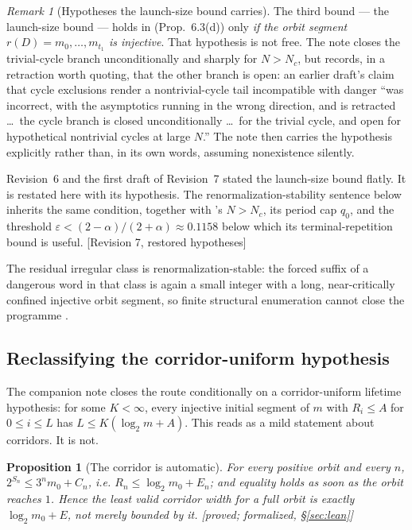 \documentclass[11pt]{article}
\theoremstyle{plain}
\newtheorem{proposition}[theorem]{Proposition}
\theoremstyle{definition}
\theoremstyle{remark}
\newtheorem{remark}[theorem]{Remark}
\newcommand{\al}{\alpha}
\newcommand{\status}[1]{\textsf{\footnotesize[#1]}}
\begin{document}
\begin{remark}[Hypotheses the launch-size bound carries]\label{rem:launchhyp}
The third bound --- the launch-size bound --- holds in \cite{DJlaunch} (Prop.~6.3(d)) only
\emph{if the orbit segment $r(D)=m_0,\dots,m_{t_1}$ is injective}. That hypothesis is not free. The
note closes the trivial-cycle branch unconditionally and sharply for $N>N_c$, but records, in a
retraction worth quoting, that the other branch is open: an earlier draft's claim that cycle
exclusions render a nontrivial-cycle tail incompatible with danger ``was incorrect, with the
asymptotics running in the wrong direction, and is retracted \dots\ the cycle branch is closed
unconditionally \dots\ for the trivial cycle, and open for hypothetical nontrivial cycles at large
$N$.'' The note then carries the hypothesis explicitly rather than, in its own words, assuming
nonexistence silently.

Revision~6 and the first draft of Revision~7 stated the launch-size bound flatly. It is restated
here with its hypothesis. The renormalization-stability sentence below inherits the same condition,
together with \cite{DJlaunch}'s $N>N_c$, its period cap $q_0$, and the threshold
$\varepsilon<(2-\al)/(2+\al)\approx0.1158$ below which its terminal-repetition bound is useful.
\status{Revision 7, restored hypotheses}
\end{remark} The residual irregular class is
renormalization-stable: the forced suffix of a dangerous word in that class is again a small
integer with a long, near-critically confined injective orbit segment, so finite structural
enumeration cannot close the programme \cite{DJlaunch}.

\subsection{Reclassifying the corridor-uniform hypothesis}\label{sec:Uall}

The companion note closes the route conditionally on a corridor-uniform lifetime hypothesis: for
some $K<\infty$, every injective initial segment of $m$ with $R_i\le A$ for $0\le i\le L$ has
$L\le K(\log_2 m+A)$. This reads as a mild statement about corridors. It is not.

\begin{proposition}[The corridor is automatic]\label{prop:corridorauto}
For every positive orbit and every $n$, $2^{S_n}\le3^nm_0+C_n$, i.e.
$R_n\le\log_2 m_0+E_n$; and equality holds as soon as the orbit reaches $1$. Hence the least valid
corridor width for a full orbit is exactly $\log_2 m_0+E$, not merely bounded by it.
\status{proved; formalized, \S\ref{sec:lean}}
\end{proposition}
\end{document}

